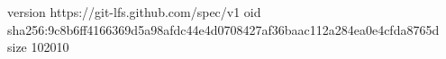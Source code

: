 version https://git-lfs.github.com/spec/v1
oid sha256:9c8b6ff4166369d5a98afdc44e4d0708427af36baac112a284ea0e4cfda8765d
size 102010
